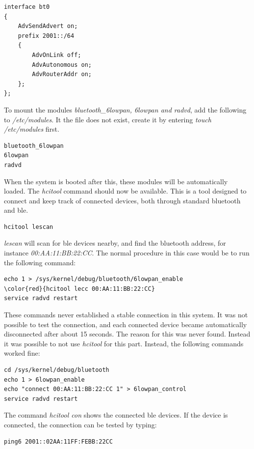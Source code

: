 \begin{verbatim}
interface bt0
{
    AdvSendAdvert on;
    prefix 2001::/64
    {
        AdvOnLink off;
        AdvAutonomous on;
        AdvRouterAddr on;
    };
};
\end{verbatim} 

To mount the modules \textit{bluetooth\_6lowpan, 6lowpan and radvd}, add the following to \textit{/etc/modules}. It the file does not exist, create it by entering \textit{touch /etc/modules} first. 

\begin{verbatim}
bluetooth_6lowpan
6lowpan
radvd
\end{verbatim}

When the system is booted after this, these modules will be automatically loaded. The \textit{hcitool} command should now be available. This is a tool designed to connect and keep track of connected devices, both through standard bluetooth and \gls{ble}. 

\begin{verbatim}
hcitool lescan
\end{verbatim}

\textit{lescan} will scan for \gls{ble} devices nearby, and find the bluetooth address, for instance \textit{00:AA:11:BB:22:CC}. The normal procedure in this case would be to run the following command: 

\begin{verbatim}
echo 1 > /sys/kernel/debug/bluetooth/6lowpan_enable
\color{red}{hcitool lecc 00:AA:11:BB:22:CC}
service radvd restart
\end{verbatim}

These commands never established a stable connection in this system. It was not possible to test the connection, and each connected device became automatically disconnected after about 15 seconds. The reason for this was never found. Instead it was possible to not use \textit{hcitool} for this part. Instead, the following commands worked fine:

\begin{verbatim}
cd /sys/kernel/debug/bluetooth
echo 1 > 6lowpan_enable
echo "connect 00:AA:11:BB:22:CC 1" > 6lowpan_control
service radvd restart
\end{verbatim} 

The command \textit{hcitool con} shows the connected \gls{ble} devices. If the device is connected, the connection can be tested by typing:

\begin{verbatim}
ping6 2001::02AA:11FF:FEBB:22CC
\end{verbatim}


